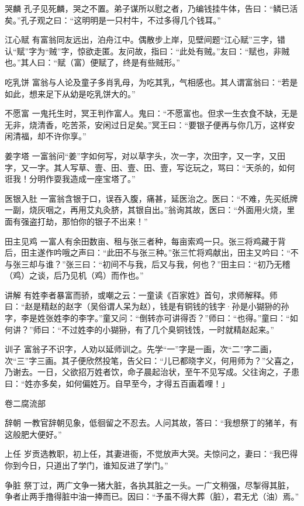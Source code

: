 \documentclass[12pt,UTF8]{ctexbook}
\begin{document}
哭麟
孔子见死麟，哭之不置。弟子谋所以慰之者，乃编钱挂牛体，告曰：“鳞已活矣。”孔子观之曰：“这明明是一只村牛，不过多得几个钱耳。”

江心赋
有富翁同友远出，泊舟江中。偶散步上岸，见壁间题“江心赋”三字，错认“赋”字为“贼”字，惊欲走匿。友问故，指曰：“此处有贼。”友曰：“赋也，非贼也。”其人曰：“赋（富）便赋了，终是有些贼形。”

吃乳饼
富翁与人论及童子多肖乳母，为吃其乳，气相感也。其人谓富翁曰：“若是如此，想来足下从幼是吃乳饼大的。”

不愿富
一鬼托生时，冥王判作富人。鬼曰：“不愿富也。但求一生衣食不缺，无是无非，烧清香，吃苦茶，安闲过日足矣。”冥王曰：“要银子便再与你几万，这样安闲清福，却不许你享。”

姜字塔
一富翁问“姜”字如何写，对以草字头，次一字，次田字，又一字，又田字，又一字。其人写草、壹、田、壹、田、壹，写讫玩之，骂曰：“天杀的，如何诳我！分明作耍我造成一座宝塔了。”

医银入肚
一富翁含银于口，误吞入腹，痛甚，延医治之。医曰：“不难，先买纸牌一副，烧灰咽之，再用艾丸灸脐，其银自出。”翁询其故，医曰：“外面用火烧，里面有强盗打劫，那怕你的银子不出来！”

田主见鸡
一富人有余田数亩、租与张三者种，每亩索鸡一只。张三将鸡藏于背后，田主遂作吟哦之声曰：“此田不与张三种。”张三忙将鸡献出，田主又吟曰：“不与张三却与谁？”张三曰：“初间不与我，后又与我，何也？”田主曰：“初乃无稽（鸡）之谈，后乃见机（鸡）而作也。”

讲解
有姓李者暴富而骄，或嘲之云：一童读《百家姓》首句，求师解释。师曰：“赵是精赵的赵字（吴俗谓人呆为赵），钱是有铜钱的钱字·孙是小猢狲的孙字，李是姓张姓李的李字。”童又问：“倒转亦可讲得否？”师曰：“也得。”童曰：“如何讲？”师曰：“不过姓李的小猢狲，有了几个臭铜钱饯，一时就精赵起来。”

训子
富翁子不识字，人劝以延师训之。先学“一”字是一画，次“二”字二画，次“三”字三画。其子便欣然投笔，告父曰：“儿已都晓字义，何用师为？”父喜之，乃谢去。一日，父欲招万姓者饮，命子晨起治状，至午不见写成。父往询之，子患曰：“姓亦多矣，如何偏姓万。自早至今，才得五百画着哩！」

卷二腐流部

辞朝
一教官辞朝见象，低徊留之不忍去。人问其故，答曰：“我想祭丁的猪羊，有这般肥大便好。”

上任
岁贡选教职，初上任，其妻进衙，不觉放声大哭。夫惊问之，妻曰：“我巴得你到今日，只道出了学门，谁知反进了学门。”

争脏
祭丁过，两广文争一猪大脏，各执其脏之一头。一广文稍强，尽掣得其脏，争者止两手撸得脏中油一捧而已。因曰：“予虽不得大葬（脏），君无尤（油）焉。”
\end{document}
